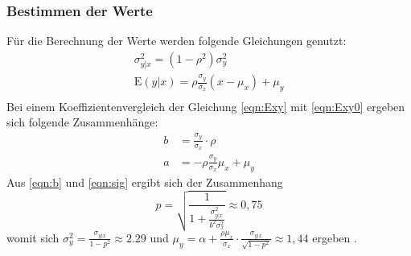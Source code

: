 \subsubsection{Bestimmen der Werte}
Für die Berechnung der Werte werden folgende Gleichungen genutzt:
\begin{align}
  \sigma_{y\lvert x}^2 = (1-\rho^2)\sigma_y^2 \label{eqn:sig}\\
  \text{E}(y\lvert x) = \rho \frac{\sigma_y}{\sigma_x} (x-\mu_x) + \mu_y \label{eqn:Exy} \\
\end{align}
Bei einem Koeffizientenvergleich der Gleichung \eqref{eqn:Exy} mit \eqref{eqn:Exy0} ergeben sich folgende Zusammenhänge:
\begin{align}
  b  &= \frac{\sigma_y}{\sigma_x} \cdot \rho \label{eqn:b} \\
a &= - \rho \frac{\sigma_y}{\sigma_x} \mu_x + \mu_y
\end{align}
Aus \eqref{eqn:b} und \eqref{eqn:sig} ergibt sich der Zusammenhang
\begin{equation}
  p=\sqrt{\frac{1}{1+\frac{\sigma^2_{y\lvert x}}{b^2 \sigma^2_x}}} \approx 0,75
\end{equation}
womit sich $\sigma^2_y=\frac{\sigma_{y\lvert x}}{1-p^2} \approx 2.29$ und $\mu_y=\alpha+\frac{\rho \mu_x}{\sigma_x} \cdot \frac{\sigma_{y\lvert x}}{\sqrt{1-p^2}} \approx 1,44 $ ergeben .
